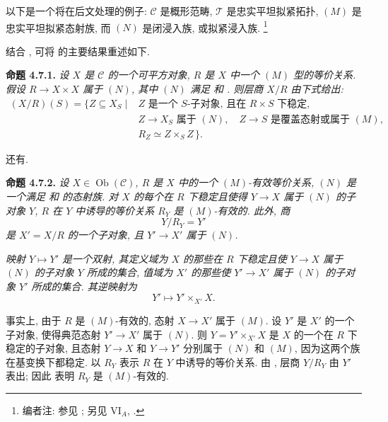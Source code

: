 以下是一个将在后文处理的例子:
\(\mathscr C\) 是概形范畴,
\(\mathcal T\) 是忠实平坦拟紧拓扑,
\((M)\) 是忠实平坦拟紧态射族,
而 \((N)\) 是闭浸入族, 或拟紧浸入族.
\footnote{编者注: 参见 ;
另见 VI\(_A\), .}

结合 ,
可将  的主要结果重述如下.

\medskip
\noindent{}\textbf{命题 4.7.1.}
\textit{设 \(X\) 是 \(\mathscr C\) 的一个可平方对象,
\(R\) 是 \(X\) 中一个 \((M)\) 型的等价关系.
假设 \(R\to X\times X\) 属于 \((N)\),
其中 \((N)\) 满足  和
.
则层商 \(X/R\) 由下式给出:}
\[
\begin{aligned}
 (X/R)(S)=\{Z\subseteq X_S\mid{}&
   Z\text{ 是一个 }S\text{-子对象, 且在 }R\times S\text{ 下稳定},\\
 & Z\to X_S\text{ 属于 }(N),\quad
   Z\to S\text{ 是覆盖态射或属于 }(M),\\
 & R_Z\simeq Z\times_S Z\,\}.
\end{aligned}
\]

还有.

\medskip
\noindent{}\textbf{命题 4.7.2.}
\textit{设 \(X\in\operatorname{Ob}(\mathscr C)\),
\(R\) 是 \(X\) 中的一个 \((M)\)-有效等价关系,
\((N)\) 是一个满足  和
 的态射族.
对 \(X\) 的每个在 \(R\) 下稳定且使得 \(Y\to X\) 属于 \((N)\)
的子对象 \(Y\), \(R\) 在 \(Y\) 中诱导的等价关系 \(R_Y\)
是 \((M)\)-有效的. 此外, 商}
\[
  Y/R_Y=Y'
\]
\textit{是 \(X'=X/R\) 的一个子对象, 且 \(Y'\to X'\) 属于 \((N)\).}

\textit{映射 \(Y\mapsto Y'\) 是一个双射,
其定义域为 \(X\) 的那些在 \(R\) 下稳定且使 \(Y\to X\)
属于 \((N)\) 的子对象 \(Y\) 所成的集合,
值域为 \(X'\) 的那些使 \(Y'\to X'\) 属于 \((N)\)
的子对象 \(Y'\) 所成的集合. 其逆映射为}
\[
  Y'\longmapsto Y'\times_{X'}X.
\]

事实上, 由于 \(R\) 是 \((M)\)-有效的, 态射 \(X\to X'\) 属于 \((M)\).
设 \(Y'\) 是 \(X'\) 的一个子对象,
使得典范态射 \(Y'\to X'\) 属于 \((N)\).
则 \(Y=Y'\times_{X'}X\) 是 \(X\) 的一个在 \(R\) 下稳定的子对象,
且态射 \(Y\to X\) 和 \(Y\to Y'\) 分别属于 \((N)\) 和 \((M)\),
因为这两个族在基变换下都稳定.
以 \(R_Y\) 表示 \(R\) 在 \(Y\) 中诱导的等价关系.
由 ,
层商 \(Y/R_Y\) 由 \(Y'\) 表出;
因此  表明 \(R_Y\) 是 \((M)\)-有效的.

